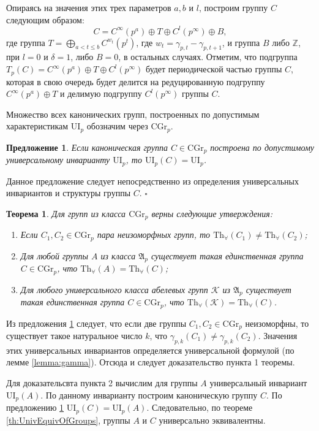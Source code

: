 \documentclass[a4paper,11pt,twoside]{article}
\newtheorem{theorem}{Теорема}[section]
\newtheorem{proposition}{Предложение}[section]
\def\proof{{\noindent{\bf Доказательство.}} }
\def\A{{\mathfrak{A}}}
\def\K{{\mathcal{K}}}
\def\Z{{\mathbb{Z}}}
\def\Tha{{\mathrm{Th}_\forall}}
\def\CG{{\mathrm{CGr}}}
\def\ui{{\mathrm{UI}}}
\begin{document}
Опираясь на значения этих трех параметров $a, b$ и $l$, построим группу $C$ следующим образом:
$$C = C^\infty(p^a) \oplus T \oplus C^l(p^\infty) \oplus B ,$$
где группа $T = \bigoplus\limits_{ a < t \leq b} C^{w_t}(p^t)$, где $w_t = \gamma_{p,t} - \gamma_{p,t+1}$, и группа $B$ либо $\Z$, при $l = 0$ и $\delta = 1$, либо $B = 0$, в остальных случаях. Отметим, что подгруппа $T_p(C) = C^\infty(p^a) \oplus T \oplus C^l(p^\infty)$ будет периодической частью группы $C$, которая в свою очередь будет делится на редуцированную подгруппу $C^\infty(p^a) \oplus T$ и делимую подгруппу $C^l(p^\infty)$ группы $C$.

Множество всех канонических групп, построенных по допустимым характеристикам $\ui_p$ обозначим через $\CG_p$.

\begin{proposition}\label{prop:UnivEnvForCannonicalGroup}
Если каноническая группа $C \in \CG_p$ построена по допустимому универсальному инварианту $\ui_p$, то $\ui_p(C) = \ui_p$.
\end{proposition}
\proof Данное предложение следует непосредственно из определения универсальных инвариантов и структуры группы $C$. $\square$

\begin{theorem}
Для групп из класса $\CG_p$ верны следующие утверждения:
\begin{enumerate}
\item Если $C_1, C_2 \in \CG_p$ пара неизоморфных групп, то $\Tha(C_1) \neq \Tha(C_2)$;
\item Для любой группы $A$ из класса $\A_p$ существует такая единственная группа $C \in \CG_p$, что $\Tha(A) = \Tha(C)$;
\item Для любого универсального класса абелевых групп $\K$ из $\A_p$ существует такая единственная группа $C \in \CG_p$, что $\Tha(\K) = \Tha(C)$.
\end{enumerate}
\end{theorem}
\proof Из предложения \ref{prop:UnivEnvForCannonicalGroup} следует, что если две группы $C_1, C_2 \in \CG_p$ неизоморфны, то существует такое натуральное число $k$, что $\gamma_{p,k}(C_1) \neq \gamma_{p,k}(C_2)$. Значения этих универсальных инвариантов определяется универсальной формулой (по лемме \ref{lemma:gamma}). Отсюда и следует доказательство пункта 1 теоремы.

Для доказательсвта пункта 2 вычислим для группы $A$ универсальный инвариант $\ui_p(A)$. По данному инварианту построим каноническую группу $C$. По предложению \ref{prop:UnivEnvForCannonicalGroup} $\ui_p(C) = \ui_p(A)$. Следовательно, по теореме \ref{th:UnivEquivOfGroups}, группы $A$ и $C$ универсально эквивалентны.
\end{document}
